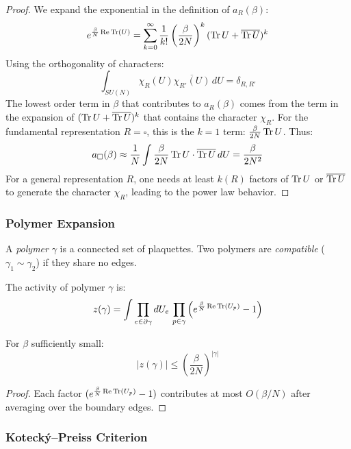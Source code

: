 \begin{proof}
We expand the exponential in the definition of $a_R(\beta)$:
\[
e^{\frac{\beta}{N} \operatorname{Re} \operatorname{Tr}(U)} = \sum_{k=0}^\infty \frac{1}{k!} \left( \frac{\beta}{2N} \right)^k (\operatorname{Tr} U + \overline{\operatorname{Tr} U})^k
\]
Using the orthogonality of characters:
\[
\int_{SU(N)} \chi_R(U) \overline{\chi_{R'}(U)} \, dU = \delta_{R, R'}
\]
The lowest order term in $\beta$ that contributes to $a_R(\beta)$ comes from the term in the expansion of $(\operatorname{Tr} U + \overline{\operatorname{Tr} U})^k$ that contains the character $\chi_R$. For the fundamental representation $R=\square$, this is the $k=1$ term: $\frac{\beta}{2N} \operatorname{Tr} U$. Thus:
\[
a_\square(\beta) \approx \frac{1}{N} \int \frac{\beta}{2N} \operatorname{Tr} U \cdot \overline{\operatorname{Tr} U} \, dU = \frac{\beta}{2N^2}
\]
For a general representation $R$, one needs at least $k(R)$ factors of $\operatorname{Tr} U$ or $\overline{\operatorname{Tr} U}$ to generate the character $\chi_R$, leading to the power law behavior.
\end{proof}

\subsubsection{Polymer Expansion}

\begin{definition}[Polymer]
A \emph{polymer} $\gamma$ is a connected set of plaquettes. Two polymers 
are \emph{compatible} ($\gamma_1 \sim \gamma_2$) if they share no edges.
\end{definition}

\begin{definition}
The activity of polymer $\gamma$ is:
\[
z(\gamma) = \int \prod_{e \in \partial\gamma} dU_e \, \prod_{p \in \gamma} 
\left(e^{\frac{\beta}{N} \operatorname{Re} \operatorname{Tr}(U_p)} - 1\right)
\]
\end{definition}

\begin{lemma}
\label{lem:activity-bound}
For $\beta$ sufficiently small:
\[
|z(\gamma)| \leq \left(\frac{\beta}{2N}\right)^{|\gamma|}
\]
\end{lemma}

\begin{proof}
Each factor $(e^{\frac{\beta}{N} \operatorname{Re} \operatorname{Tr}(U_p)} - 1)$ contributes at most 
$O(\beta/N)$ after averaging over the boundary edges.
\end{proof}

\subsubsection{Koteck\'y--Preiss Criterion}

